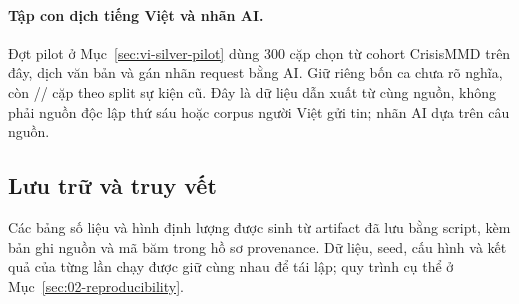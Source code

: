 \paragraph{Tập con dịch tiếng Việt và nhãn AI.} Đợt pilot ở Mục~\ref{sec:vi-silver-pilot} dùng 300 cặp chọn từ cohort CrisisMMD trên đây, dịch văn bản và gán nhãn request bằng AI. Giữ riêng bốn ca chưa rõ nghĩa, còn \VISilverTrainN/\VISilverDevN/\VISilverTestN{} cặp theo split sự kiện cũ. Đây là dữ liệu dẫn xuất từ cùng nguồn, không phải nguồn độc lập thứ sáu hoặc corpus người Việt gửi tin; nhãn AI dựa trên câu nguồn.

\subsection{Lưu trữ và truy vết}
Các bảng số liệu và hình định lượng được sinh từ artifact đã lưu bằng script, kèm bản ghi nguồn và mã băm trong hồ sơ provenance. Dữ liệu, seed, cấu hình và kết quả của từng lần chạy được giữ cùng nhau để tái lập; quy trình cụ thể ở Mục~\ref{sec:02-reproducibility}.
